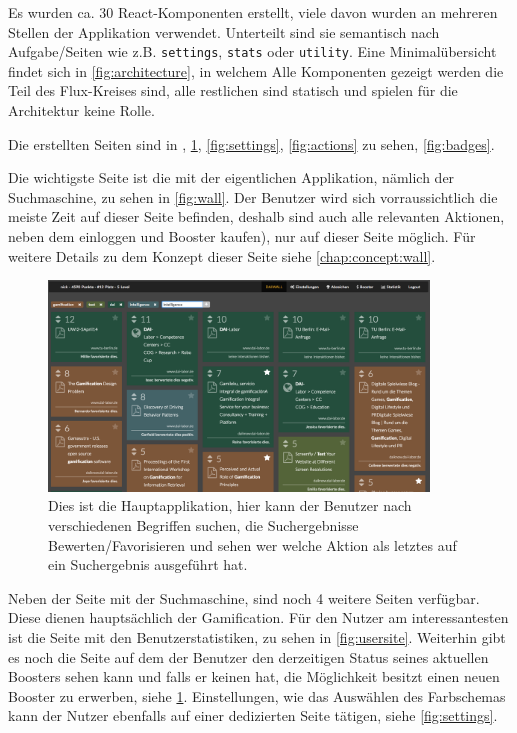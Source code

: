 \documentclass[12pt,twoside]{book}
\begin{document}
Es wurden ca. 30 React-Komponenten erstellt, viele davon wurden an mehreren Stellen der Applikation verwendet. Unterteilt sind sie semantisch nach Aufgabe/Seiten wie z.B. \texttt{settings}, \texttt{stats} oder \texttt{utility}.
Eine Minimalübersicht findet sich in \ref{fig:architecture}, in welchem Alle Komponenten gezeigt werden die Teil des Flux-Kreises sind, alle restlichen sind statisch und spielen für die Architektur keine Rolle.

Die erstellten Seiten sind in , \ref{fig:booster}, \ref{fig:settings}, \ref{fig:actions} zu sehen, \ref{fig:badges}.


Die wichtigste Seite ist die mit der eigentlichen Applikation, nämlich der Suchmaschine, zu sehen in \ref{fig:wall}. Der Benutzer wird sich vorraussichtlich die meiste Zeit auf dieser Seite befinden, deshalb sind auch alle relevanten Aktionen, neben dem einloggen und Booster kaufen), nur auf dieser Seite möglich. Für weitere Details zu dem Konzept dieser Seite siehe \ref{chap:concept:wall}.

\begin{figure}[H]
    \centering
    \includegraphics[width=0.9\textwidth]{images/infoboard_wall.png}
    \caption{Dies ist die Hauptapplikation, hier kann der Benutzer nach verschiedenen Begriffen suchen, die Suchergebnisse Bewerten/Favorisieren und sehen wer welche Aktion als letztes auf ein Suchergebnis ausgeführt hat.}
    \label{fig:booster}
\end{figure}

Neben der Seite mit der Suchmaschine, sind noch 4 weitere Seiten verfügbar. Diese dienen hauptsächlich der Gamification. Für den Nutzer am interessantesten ist die Seite mit den Benutzerstatistiken, zu sehen in \ref{fig:usersite}.
Weiterhin gibt es noch die Seite auf dem der Benutzer den derzeitigen Status seines aktuellen Boosters sehen kann und falls er keinen hat, die Möglichkeit besitzt einen neuen Booster zu erwerben, siehe \ref{fig:booster}. Einstellungen, wie das Auswählen des Farbschemas kann der Nutzer ebenfalls auf einer dedizierten Seite tätigen, siehe \ref{fig:settings}.
\end{document}
